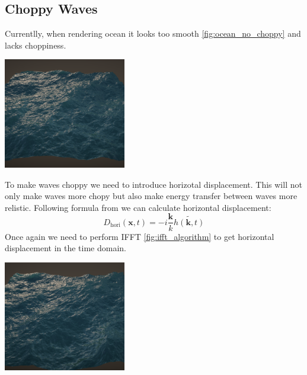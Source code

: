 \subsection{Choppy Waves}
Currentlly, when rendering ocean it looks too smooth \ref{fig:ocean_no_choppy} and lacks choppiness.

\begin{minipage}{1\textwidth}
    \centering
    \includegraphics[width=0.40\textwidth]{"images/rendered_height_no_coppy.png"}
    \label{fig:ocean_no_choppy}
\end{minipage}

To make waves choppy we need to introduce horizotal displacement. This will not only make waves more chopy but also make energy transfer between waves more relistic. Following formula from \cite[J. Tessendorf]{tessendorf2004} we can calculate horizontal displacement:
\begin{equation}
    D_{\text{hori}}(\textbf{x}, t) = -i\frac{\mathbf{k}}{k}\tilde{h(\mathbf{k}, t)}
\end{equation}
Once again we need to perform IFFT \ref{fig:ifft_algorithm} to get horizontal displacement in the time domain.

\begin{minipage}{1\textwidth}
    \centering
    \includegraphics[width=0.40\textwidth]{"images/rendered_height_choppy.png"}
    \label{fig:ocean_choppy}
\end{minipage}

